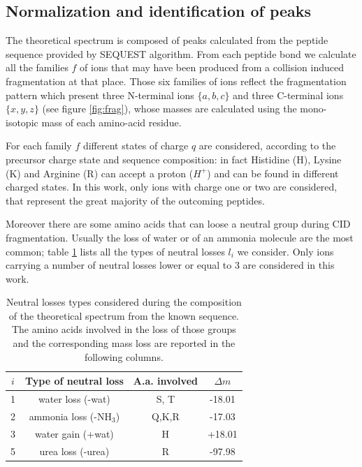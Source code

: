\subsection{Normalization and identification of peaks}

The theoretical spectrum is composed of peaks calculated from the peptide
sequence provided by SEQUEST algorithm.
From each peptide bond we calculate all the families $f$ of ions that may have
been produced from a collision induced fragmentation at that place. Those six families of ions
reflect the fragmentation pattern which present three N-terminal ions $\{a,b,c\}$ and 
three C-terminal ions $\{x,y,z\}$ (see figure \ref{fig:frag}), 
whose masses are calculated using the
mono-isotopic mass of each amino-acid residue.

For each family $f$ different states of charge $q$ are considered, 
according to the precursor charge state and sequence composition: in fact
 Histidine (H),
Lysine (K) and Arginine (R) can accept a proton ($H^+$) and can be found in 
different charged states. In this work, only ions
with charge one or two are considered, that represent the great majority of the
outcoming peptides.


Moreover there are some amino acids that can loose a neutral group
during CID fragmentation. 
Usually the loss of water or of an ammonia molecule are the most common; table
\ref{tab:neutral-losses} lists all the types of neutral losses $l_i$ we consider.
Only ions carrying a number of neutral losses lower or equal to 3 are considered
in this work.

\begin{table}[!thb]
\centering
\begin{tabular}{cccc}
\hline
\hline
$i$&Type of neutral loss & A.a. involved & $\Delta m$\\
\hline
1&water loss (-wat)	    & S, T    & -18.01\\
2&ammonia loss (-NH$_3$)    & Q,K,R   &	-17.03\\
3&water gain (+wat)	    & H	      &	+18.01\\
5&urea loss (-urea)	    & R	      &	-97.98\\
\hline
\hline
\end{tabular}
\caption{\label{tab:neutral-losses}
Neutral losses types considered during the composition of the theoretical
spectrum from the known sequence.
The amino acids involved in the loss of those groups and the corresponding mass
loss are reported in the following columns.}
\end{table}


